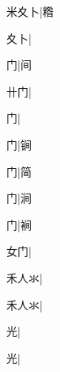 \begin{multicols}{2}
{{\cjk{}米夊卜}\mktsJzrVerticalBar{}{\cjk{}{\cnsym{}　}{\cnsym{}　}{\cnsym{}　}}|{\cjk{}糌}\par
{夊卜}\mktsJzrVerticalBar{}{\cjk{}{\cnsym{}　}{\cnsym{}　}{\cnsym{}　}}|{}\par
{\cjk{}{\cnsym{}　}{\cnsym{}　}门}\mktsJzrVerticalBar{}{\cjk{}{\cnsym{}　}{\cnsym{}　}{\cnsym{}　}}|{\cjk{}间}\par
{\cjk{}{\cnsym{}　}卄门}\mktsJzrVerticalBar{}{\cjk{}{\cnsym{}　}{\cnsym{}　}{\cnsym{}　}}|{}\par
{门}\mktsJzrVerticalBar{}{\cjk{}{\cnsym{}　}{\cnsym{}　}{\cnsym{}　}}|{}\par
{门}\mktsJzrVerticalBar{}{\cjk{}{\cnsym{}　}{\cnsym{}　}{\cnsym{}　}}|{\cjk{}锏}\par
{门}\mktsJzrVerticalBar{}{\cjk{}{\cnsym{}　}{\cnsym{}　}{\cnsym{}　}}|{\cjk{}简}\par
{门}\mktsJzrVerticalBar{}{\cjk{}{\cnsym{}　}{\cnsym{}　}{\cnsym{}　}}|{\cjk{}涧}\par
{门}\mktsJzrVerticalBar{}{\cjk{}{\cnsym{}　}{\cnsym{}　}{\cnsym{}　}}|{\cjk{}裥}\par
{\cjk{}{\cnsym{}　}女门}\mktsJzrVerticalBar{}{\cjk{}{\cnsym{}　}{\cnsym{}　}{\cnsym{}　}}|{}\par
{\cjk{}禾人氺}\mktsJzrVerticalBar{}{\cjk{}{\cnsym{}　}{\cnsym{}　}{\cnsym{}　}}|{}\par
{\cjk{}禾人氺}\mktsJzrVerticalBar{}{\cjk{}{\cnsym{}　}{\cnsym{}　}{\cnsym{}　}}|{}\par
{\cjk{}{\cnsym{}　}{\cnsym{}　}光}\mktsJzrVerticalBar{}{\cjk{}{\cnsym{}　}{\cnsym{}　}{\cnsym{}　}}|{}\par
{\cjk{}{\cnsym{}　}{\cnsym{}　}光}\mktsJzrVerticalBar{}{\cjk{}{\cnsym{}　}{\cnsym{}　}{\cnsym{}　}}|{}\par
}
\end{multicols}
